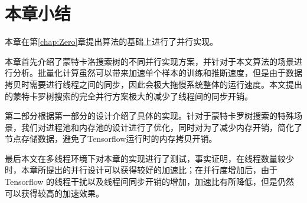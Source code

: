 \section{本章小结}
本章在第\ref{chap:Zero}章提出算法的基础上进行了并行实现。

本章首先介绍了蒙特卡洛搜索树的不同并行实现方案，并针对于本文算法的场景进行分析。批量化计算虽然可以带来加速单个样本的训练和推断速度，但是由于数据拷贝时需要进行线程之间的同步，因此会极大拖慢系统整体的运行速度。本文提出的蒙特卡罗树搜索的完全并行方案极大的减少了线程间的同步开销。

第二部分根据第一部分的设计介绍了具体的实现。针对于蒙特卡罗树搜索的特殊场景，我们对进程池和内存池的设计进行了优化，同时对为了减少内存开销，简化了节点存储数据，避免了Tensorflow运行时的内存拷贝开销。

最后本文在多线程环境下对本章的实现进行了测试，事实证明，在线程数量较少时，本章所提出的并行设计可以获得较好的加速比；在并行度增加后，由于 Tensorflow 的线程干扰以及线程间同步开销的增加，加速比有所降低，但是仍然可以获得较高的加速效果。
